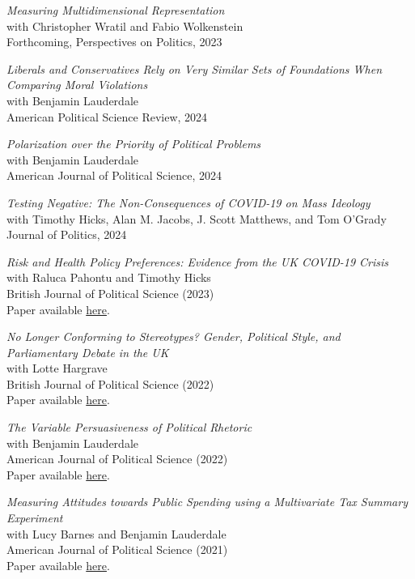 \documentclass[centered]{res}
\begin{document}
\begin{resume}
{\sl Measuring Multidimensional Representation} \\
with Christopher Wratil and Fabio Wolkenstein \\
Forthcoming, Perspectives on Politics, 2023

{\sl Liberals and Conservatives Rely on Very Similar Sets of Foundations When Comparing Moral Violations} \\
with Benjamin Lauderdale \\
American Political Science Review, 2024

{\sl Polarization over the Priority of Political Problems} \\
with Benjamin Lauderdale \\
American Journal of Political Science, 2024

{\sl Testing Negative: The Non-Consequences of COVID-19 on Mass Ideology} \\
with Timothy Hicks, Alan M. Jacobs, J. Scott Matthews, and Tom O'Grady \\
Journal of Politics, 2024

{\sl Risk and Health Policy Preferences: Evidence from the UK COVID-19 Crisis} \\
with Raluca Pahontu and Timothy Hicks \\
British Journal of Political Science (2023) \\
Paper available \href{https://doi.org/10.1017/S0007123422000539} {here}.

{\sl No Longer Conforming to Stereotypes? Gender, Political Style, and Parliamentary Debate in the UK} \\
with Lotte Hargrave\\
British Journal of Political Science (2022)\\
Paper available \href{https://doi.org/10.1017/S0007123421000648} {here}.

{\sl The Variable Persuasiveness of Political Rhetoric} \\
with Benjamin Lauderdale\\
American Journal of Political Science (2022)\\
Paper available \href{https://doi.org/10.1111/ajps.12703} {here}.

{\sl Measuring Attitudes towards Public Spending using a Multivariate Tax Summary Experiment} \\
with Lucy Barnes and Benjamin Lauderdale\\
American Journal of Political Science (2021)\\
Paper available \href{https://www.jackblumenau.com/papers/spending_experiment.pdf} {here}.


\end{resume}
\end{document}
